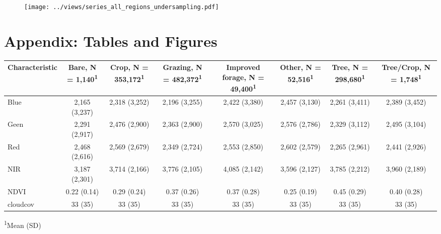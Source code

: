 \documentclass[10pt,a4paper,onecolumn]{article}
\begin{document}
  \begin{figure}[H] \centering
            \captionsetup{justification=centering}
              \texttt{[image: ../views/series\_all\_regions\_undersampling.pdf]}
              
 \end{figure}

 




\pagebreak
\appendix
\renewcommand{\theequation}{\Alph{chapter}.\arabic{equation}}

\setcounter{figure}{0}
\setcounter{table}{0}
\makeatletter 
\renewcommand{\thefigure}{A.\@arabic\c@figure}
\renewcommand{\thetable}{A.\@arabic\c@table}

\section{Appendix: Tables and Figures}\label{sec:appendix_tables} 



\captionsetup[table]{labelformat=empty,skip=1pt}
\scriptsize
\begin{longtable}{lccccccc}
\toprule
\textbf{Characteristic} & \textbf{Bare}, N = 1,140\textsuperscript{1} & \textbf{Crop}, N = 353,172\textsuperscript{1} & \textbf{Grazing}, N = 482,372\textsuperscript{1} & \textbf{Improved forage}, N = 49,400\textsuperscript{1} & \textbf{Other}, N = 52,516\textsuperscript{1} & \textbf{Tree}, N = 298,680\textsuperscript{1} & \textbf{Tree/Crop}, N = 1,748\textsuperscript{1} \\ 
\midrule
Blue & 2,165 (3,237) & 2,318 (3,252) & 2,196 (3,255) & 2,422 (3,380) & 2,457 (3,130) & 2,261 (3,411) & 2,389 (3,452) \\ 
Geen & 2,291 (2,917) & 2,476 (2,900) & 2,363 (2,900) & 2,570 (3,025) & 2,576 (2,786) & 2,329 (3,112) & 2,495 (3,104) \\ 
Red & 2,468 (2,616) & 2,569 (2,679) & 2,349 (2,724) & 2,553 (2,850) & 2,602 (2,579) & 2,265 (2,961) & 2,441 (2,926) \\ 
NIR & 3,187 (2,301) & 3,714 (2,166) & 3,776 (2,105) & 4,085 (2,142) & 3,596 (2,127) & 3,785 (2,212) & 3,960 (2,189) \\ 
NDVI & 0.22 (0.14) & 0.29 (0.24) & 0.37 (0.26) & 0.37 (0.28) & 0.25 (0.19) & 0.45 (0.29) & 0.40 (0.28) \\ 
cloudcov & 33 (35) & 33 (35) & 33 (35) & 33 (35) & 33 (35) & 33 (35) & 33 (35) \\ 
 \bottomrule
\end{longtable}
\vspace{-5mm}
\begin{minipage}{\linewidth}
\textsuperscript{1}Mean (SD) \\ 
\end{minipage}
\end{document}
